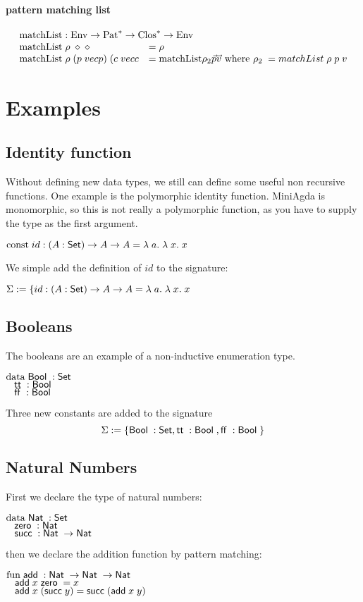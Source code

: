 \paragraph*{pattern matching list}
\[
\begin{array}{ll}
\multicolumn{2}{l}{\matchList : \Env \ra \ves{\Pat} \ra \ves{\Clos} \ra \Env }\\
\matchList \; \rho \; \diamond \; \diamond & = \rho \\
\matchList \; \rho \; (p \; vec{p}) \; (c \; vec{c} & = \matchList \rho_2 \vec{p} \vec{v} \mbox{ where } \rho_2 \; = matchList \; \rho \; p \; v \\
\end{array}
\]

\section{Examples}
\subsection{Identity function}
Without defining new data types, we still can define some useful non recursive functions.
One example is the polymorphic identity function. 
MiniAgda is monomorphic, so this is not really a polymorphic function, as you have to supply the
type as the first argument.
\begin{bsp}
$\mathrm{const}\; id : ( A : \mathsf{Set} ) \rightarrow{A \rightarrow A} = \lambda\; a .\;\lambda\; x .\;x$   
\end{bsp}
We simple add the definition of $id$ to the signature:
\begin{bsp}
$\mathrm{\Sigma} := \{ id : ( A : \mathsf{Set} ) \rightarrow{A \rightarrow A} = \lambda\; a .\;\lambda\; x .\;x$
\end{bsp}
\subsection{Booleans}
The booleans are an example of a non-inductive enumeration type.
\begin{bsp}
$\mathrm{data}\; \mathsf{Bool}\; : \mathsf{Set}$  \\
$\hspace*{3mm} \mathsf{tt}\; : \mathsf{Bool}\; $\\
$\hspace*{3mm} \mathsf{ff}\; : \mathsf{Bool}\; $
\end{bsp}
Three new constants are added to the signature
\[ \mathrm{\Sigma} := \{ \mathsf{Bool}\; : \mathsf{Set} , \mathsf{tt}\; : \mathsf{Bool}\; , \mathsf{ff}\; : \mathsf{Bool}\; \} \]
\subsection{Natural Numbers}
First we declare the type of natural numbers:
\begin{bsp}
$\mathrm{data}\; \mathsf{Nat}\; : \mathsf{Set}$ \\
$\hspace*{3mm} \mathsf{zero}\; : \mathsf{Nat}\; $\\
$\hspace*{3mm} \mathsf{succ}\; : \mathsf{Nat}\; \rightarrow \mathsf{Nat}\;$
\end{bsp}
then we declare the addition function by pattern matching:
\begin{bsp}
$\mathrm{fun}\; \mathsf{add}\; : \mathsf{Nat}\; \rightarrow \mathsf{Nat}\; \rightarrow \mathsf{Nat}\;$\\
$\hspace*{3mm} \mathsf{add}\; x \; \mathsf{zero}\; = x $\\
$\hspace*{3mm} \mathsf{add}\; x \; (\mathsf{succ}\; y) = \mathsf{succ}\; (\mathsf{add}\; x \; y)  $
\end{bsp}
